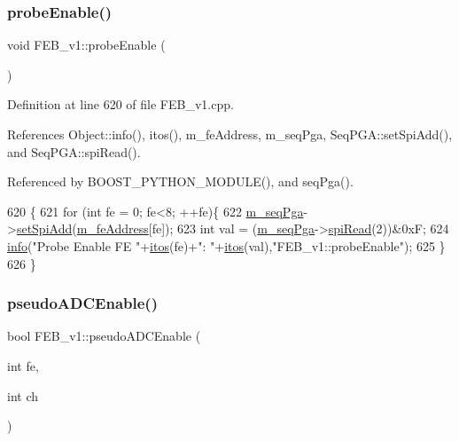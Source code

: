 \subsubsection{\texorpdfstring{probe\+Enable()}{probeEnable()}}
{\footnotesize\ttfamily void F\+E\+B\+\_\+v1\+::probe\+Enable (\begin{DoxyParamCaption}{ }\end{DoxyParamCaption})}



Definition at line 620 of file F\+E\+B\+\_\+v1.\+cpp.



References Object\+::info(), itos(), m\+\_\+fe\+Address, m\+\_\+seq\+Pga, Seq\+P\+G\+A\+::set\+Spi\+Add(), and Seq\+P\+G\+A\+::spi\+Read().



Referenced by B\+O\+O\+S\+T\+\_\+\+P\+Y\+T\+H\+O\+N\+\_\+\+M\+O\+D\+U\+L\+E(), and seq\+Pga().


\begin{DoxyCode}
620                         \{
621   \textcolor{keywordflow}{for} (\textcolor{keywordtype}{int} fe = 0; fe<8; ++fe)\{
622     \hyperlink{classFEB__v1_a6c7804ac86796f233a8393043adf2e77}{m\_seqPga}->\hyperlink{classSeqPGA_ac998ce3a6d9b5f2e88cc8393f8c1df53}{setSpiAdd}(\hyperlink{classFEB__v1_a4e1945c2d5b434125f375e9d0fc6d99f}{m\_feAddress}[fe]);
623     \textcolor{keywordtype}{int} val = (\hyperlink{classFEB__v1_a6c7804ac86796f233a8393043adf2e77}{m\_seqPga}->\hyperlink{classSeqPGA_ab3d0e5e5d4014bc7a92588a76b8713d4}{spiRead}(2))&0xF;
624     \hyperlink{classObject_a644fd329ea4cb85f54fa6846484b84a8}{info}(\textcolor{stringliteral}{"Probe Enable FE "}+\hyperlink{Tools_8h_af330027dbdafb9a30768b3613c553e60}{itos}(fe)+\textcolor{stringliteral}{": "}+\hyperlink{Tools_8h_af330027dbdafb9a30768b3613c553e60}{itos}(val),\textcolor{stringliteral}{"FEB\_v1::probeEnable"});
625   \}
626 \}
\end{DoxyCode}
\mbox{\label{classFEB__v1_aeb6c988faf48d93637ef669c54e25223}} 
\subsubsection{\texorpdfstring{pseudo\+A\+D\+C\+Enable()}{pseudoADCEnable()}}
{\footnotesize\ttfamily bool F\+E\+B\+\_\+v1\+::pseudo\+A\+D\+C\+Enable (\begin{DoxyParamCaption}\item[{int}]{fe,  }\item[{int}]{ch }\end{DoxyParamCaption})}



